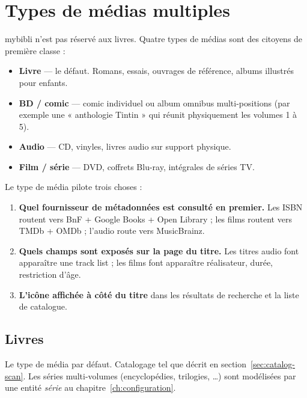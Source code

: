 \chapter{Types de médias multiples}
\label{ch:multimedia}

mybibli n'est pas réservé aux livres. Quatre types de
médias sont des citoyens de première classe :

\begin{itemize}
  \item \textbf{Livre} — le défaut. Romans, essais, ouvrages de
        référence, albums illustrés pour enfants.
  \item \textbf{BD / comic} — comic individuel ou
        album omnibus multi-positions (par exemple une « anthologie
        Tintin » qui réunit physiquement les volumes 1 à 5).
  \item \textbf{Audio} — CD, vinyles, livres audio sur support
        physique.
  \item \textbf{Film / série} — DVD, coffrets Blu-ray,
        intégrales de séries TV.
\end{itemize}

Le type de média pilote trois choses :

\begin{enumerate}
  \item \textbf{Quel fournisseur de métadonnées est consulté en
        premier.} Les ISBN routent vers BnF + Google Books + Open
        Library ; les films routent vers TMDb + OMDb ; l'audio
        route vers MusicBrainz.
  \item \textbf{Quels champs sont exposés sur la page du titre.}
        Les titres audio font apparaître une track list ; les
        films font apparaître réalisateur, durée, restriction
        d'âge.
  \item \textbf{L'icône affichée à côté du titre} dans les
        résultats de recherche et la liste de catalogue.
\end{enumerate}

\section{Livres}

Le type de média par défaut. Catalogage tel que décrit en
section~\ref{sec:catalog-scan}. Les séries multi-volumes
(encyclopédies, trilogies, \dots) sont modélisées par une entité
\emph{série} au chapitre~\ref{ch:configuration}.

